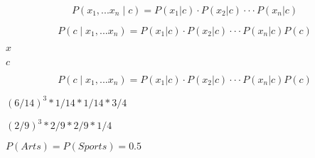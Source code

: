 \documentclass[10pt]{book}
\begin{document}
\begin{mdSnippets}
\begin{mdDisplaySnippet}[71b91f52921236d0e2b3c8ed7e65b48f]
\[%
P(x_1, ... x_n \mid c) = P(x_1|c)⋅P(x_2|c)⋅⋅⋅P(x_n|c)
\]%
\end{mdDisplaySnippet}%
\begin{mdDisplaySnippet}[2cb4451452624fd0ce4c3afdd6d51f95]%
\[%
P(c \mid x_1, ... x_n) = P(x_1|c)⋅P(x_2|c)⋅⋅⋅P(x_n|c) P(c)
\]%
\end{mdDisplaySnippet}%
\begin{mdInlineSnippet}[9dd4e461268c8034f5c8564e155c67a6]%
$x$\end{mdInlineSnippet}%
\begin{mdInlineSnippet}[4a8a08f09d37b73795649038408b5f33]%
$c$\end{mdInlineSnippet}%
\begin{mdDisplaySnippet}[2cb4451452624fd0ce4c3afdd6d51f95]%
\[%
P(c \mid x_1, ... x_n) = P(x_1|c)⋅P(x_2|c)⋅⋅⋅P(x_n|c) P(c)
\]%
\end{mdDisplaySnippet}%
\begin{mdInlineSnippet}[3cf1de5d88668faac4491155789e29e6]%
$(6/14)^3 * 1/14 * 1/14 * 3/4$\end{mdInlineSnippet}%
\begin{mdInlineSnippet}[385b7a3dad381564c253c98b98989f7e]%
$(2/9)^3 * 2/9 * 2/9 * 1/4$\end{mdInlineSnippet}%
\begin{mdInlineSnippet}%
$P(Arts) = P(Sports) = 0.5$\end{mdInlineSnippet}%

\end{mdSnippets}
\end{document}
